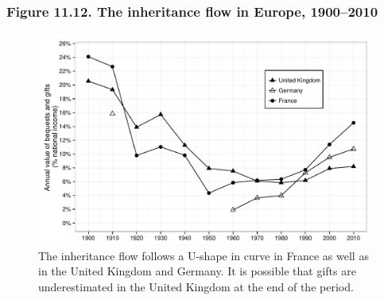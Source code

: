 \documentclass[t]{beamer}\usepackage[]{graphicx}\usepackage[]{color}
\newenvironment{knitrout}{}{} %
\begin{document}
\begin{frame}[label=Figure_11_12]
\frametitle{Figure 11.12. The inheritance flow in Europe, 1900--2010}
\begin{figure}[t]
\begin{minipage}[b]{\textwidth}
\centering
\begin{knitrout}\footnotesize
{}\color{fgcolor}

{\centering \includegraphics[width=1\linewidth]{figures/bw/Figure_11_12} 

}



\end{knitrout}
\caption{The inheritance flow follows a U-shape in curve in France as well as in the United Kingdom and Germany. It is possible that gifts are underestimated in the United Kingdom at the end of the period.}
\end{minipage}
\end{figure}
\end{frame}
\end{document}

